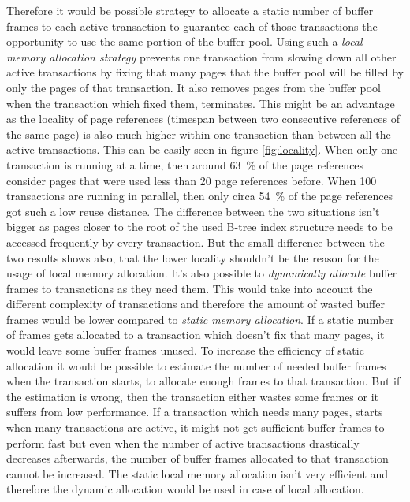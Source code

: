     Therefore it would be possible strategy to allocate a static number of buffer frames to each active transaction to guarantee each of those transactions the opportunity to use the same portion of the buffer pool. Using such a \emph{local memory allocation strategy} prevents one transaction from slowing down all other active transactions by fixing that many pages that the buffer pool will be filled by only the pages of that transaction. It also removes pages from the buffer pool when the transaction which fixed them, terminates. This might be an advantage as the locality of page references (timespan between two consecutive references of the same page) is also much higher within one transaction than between all the active transactions. This can be easily seen in figure \ref{fig:locality}. When only one transaction is running at a time, then around \SI{63}{\percent} of the page references consider pages that were used less than 20 page references before. When 100 transactions are running in parallel, then only circa \SI{54}{\percent} of the page references got such a low reuse distance. The difference between the two situations isn't bigger as pages closer to the root of the used B-tree index structure needs to be accessed frequently by every transaction. But the small difference between the two results shows also, that the lower locality shouldn't be the reason for the usage of local memory allocation. It's also possible to \emph{dynamically allocate} buffer frames to transactions as they need them. This would take into account the different complexity of transactions and therefore the amount of wasted buffer frames would be lower compared to \emph{static memory allocation}. If a static number of frames gets allocated to a transaction which doesn't fix that many pages, it would leave some buffer frames unused. To increase the efficiency of static allocation it would be possible to estimate the number of needed buffer frames when the transaction starts, to allocate enough frames to that transaction. But if the estimation is wrong, then the transaction either wastes some frames or it suffers from low performance. If a transaction which needs many pages, starts when many transactions are active, it might not get sufficient buffer frames to perform fast but even when the number of active transactions drastically decreases afterwards, the number of buffer frames allocated to that transaction cannot be increased. The static local memory allocation isn't very efficient and therefore the dynamic allocation would be used in case of local allocation.


